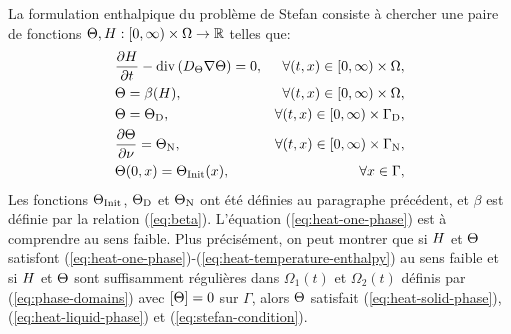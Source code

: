 La formulation enthalpique du problème de Stefan consiste à chercher
une paire de fonctions
$\Theta,H:[0,\infty)\times\Omega\to\mathbb R$
telles que:
\begin{align}
  & \frac{\partial \enthalpydensity}{\partial t} %
  - \div\parent{ \electrolytetdiff\nabla \temperature} = 0,%
  & \forall (t, x) \in [0,\infty)\times
    \Omega,\label{eq:heat-one-phase}\\
  & \temperature = \beta(\enthalpydensity),
    &\forall (t, x) \in [0,\infty)\times \Omega,\label{eq:heat-temperature-enthalpy}\\
  & \temperature = \temperature_\mathrm{D}, %
  & \forall (t, x) \in [0,\infty)\times \Gamma_\mathrm{D},\label{eq:heat-one-phase-dirichlet}\\
  & \frac{\partial \temperature}{\partial \nu} = \temperature_\mathrm{N}, %
  & \forall (t, x) \in [0,\infty)\times \Gamma_\mathrm{N},\label{eq:heat-one-phase-neumann}\\
  & \temperature(0, x) = \tinit(x),
  & \forall x\in\Gamma,\label{eq:heat-initial-condition}
\end{align}
Les fonctions $\Theta_\text{Init}$, $\Theta_\mathrm{D}$ et
$\Theta_\mathrm{N}$ ont été définies au paragraphe précédent, et
$\beta$ est définie par la relation (\ref{eq:beta}). L'équation
(\ref{eq:heat-one-phase}) est à comprendre au sens faible. Plus
précisément, on peut montrer que si $H$ et
$\Theta$ satisfont
(\ref{eq:heat-one-phase})-(\ref{eq:heat-temperature-enthalpy}) au sens
faible et si
$H$ et $\Theta$ sont suffisamment régulières dans
$\Omega_1(t)$ et $\Omega_2(t)$ définis par (\ref{eq:phase-domains})
avec $\left[ \Theta \right] = 0$ sur $\Gamma$,
alors $\Theta$ satisfait (\ref{eq:heat-solid-phase}),
(\ref{eq:heat-liquid-phase}) et (\ref{eq:stefan-condition}).


